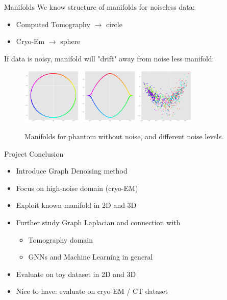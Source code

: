\documentclass[aspectratio=169]{beamer}
\begin{document}
\begin{frame}[c]{Manifolds}
    We know structure of manifolds for noiseless data:
    \begin{itemize}
        \item Computed Tomography $\to$ circle
        \item Cryo-Em $\to$ sphere
    \end{itemize}

    If data is noisy, manifold will "drift" away from noise less manifold:
    \begin{figure}
        \includegraphics[width=0.25\textwidth]{phantom_second_third_evec}
        \includegraphics[width=0.25\textwidth]{phantom_second_third_evec_noisy}
        \includegraphics[width=0.25\textwidth]{phantom_second_third_evec_noisy_high}
        \caption{Manifolds for phantom without noise, and different noise levels.}
    \end{figure}
\end{frame}


\begin{frame}{Project Conclusion}
    \begin{itemize}
        \item Introduce Graph Denoising method
        \item Focus on high-noise domain (cryo-EM)
        \item Exploit known manifold in 2D and 3D
        \item Further study Graph Laplacian and connection with
            \begin{itemize}
                \item Tomography domain
                \item GNNs and Machine Learning in general
            \end{itemize}
        \item Evaluate on toy dataset in 2D and 3D
        \item Nice to have: evaluate on cryo-EM / CT dataset
    \end{itemize}
\end{frame}
\end{document}
